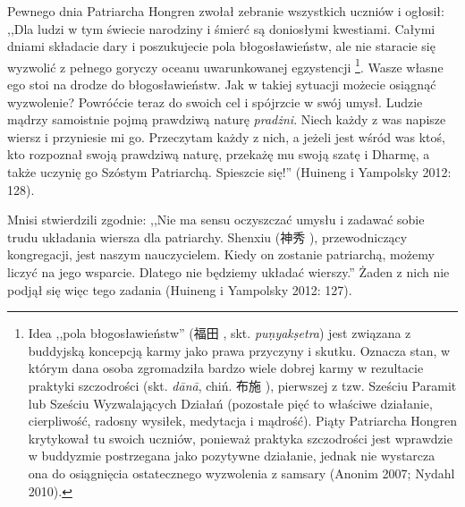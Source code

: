Pewnego dnia Patriarcha Hongren zwołał zebranie wszystkich uczniów i ogłosił:
,,Dla ludzi w tym świecie narodziny i śmierć są doniosłymi kwestiami. Całymi dniami składacie dary i poszukujecie pola błogosławieństw, ale nie staracie się wyzwolić z pełnego goryczy oceanu uwarunkowanej egzystencji%
\footnote{Idea ,,pola błogosławieństw'' (福田 , skt. \textit{pu\d{n}yak\d{s}etra}) jest związana z buddyjską koncepcją karmy jako prawa przyczyny i skutku. Oznacza stan, w którym dana osoba zgromadziła bardzo wiele dobrej karmy w rezultacie praktyki szczodrości (skt. \textit{dānā}, chiń. 布施 ), pierwszej z tzw. Sześciu Paramit lub Sześciu Wyzwalających Działań (pozostałe pięć to właściwe działanie, cierpliwość, radosny wysiłek, medytacja i mądrość).\label{Paramitas}
Piąty Patriarcha Hongren krytykował tu swoich uczniów, ponieważ praktyka szczodrości jest wprawdzie w buddyzmie postrzegana jako pozytywne działanie, jednak nie wystarcza ona do osiągnięcia ostatecznego wyzwolenia z samsary (Anonim 2007; Nydahl 2010).}.
Wasze własne ego stoi na drodze do błogosławieństw. Jak w takiej sytuacji możecie osiągnąć wyzwolenie? Powróćcie teraz do swoich cel i spójrzcie w swój umysł. Ludzie mądrzy samoistnie pojmą prawdziwą naturę \textit{pradżni}\fnm. Niech każdy z was napisze wiersz i przyniesie mi go. Przeczytam każdy z nich, a jeżeli jest wśród was ktoś, kto rozpoznał swoją prawdziwą naturę, przekażę mu swoją szatę i Dharmę, a także uczynię go Szóstym Patriarchą. Spieszcie się!''
(Huineng i Yampolsky 2012: 128).

Mnisi stwierdzili zgodnie: ,,Nie ma sensu oczyszczać umysłu i zadawać sobie trudu układania wiersza dla patriarchy. Shenxiu (神秀 ), przewodniczący kongregacji, jest naszym nauczycielem.
Kiedy on zostanie patriarchą, możemy liczyć na jego wsparcie. Dlatego nie będziemy układać wierszy.'' Żaden z nich nie podjął się więc tego zadania
(Huineng i Yampolsky 2012: 127).


